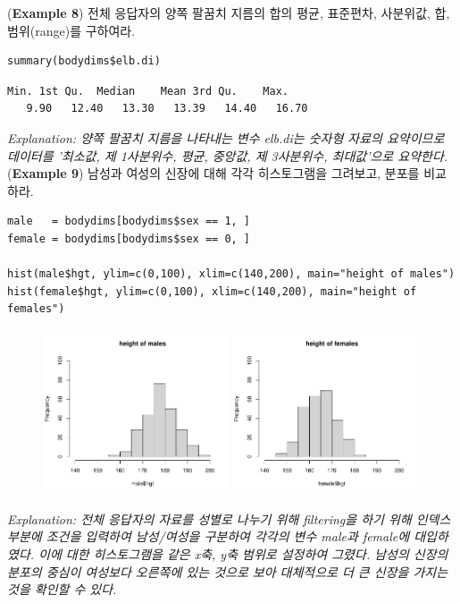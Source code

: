 \documentclass{article}
\begin{document}
(\textbf{Example 8}) 전체 응답자의 양쪽 팔꿈치 지름의 합의 평균, 표준편차, 사분위값, 합, 범위(range)를 구하여라.
\begin{lstlisting}[style={r-style}]
summary(bodydims$elb.di)
\end{lstlisting}
\begin{lstlisting}[style={out-style}]
   Min. 1st Qu.  Median    Mean 3rd Qu.    Max. 
   9.90   12.40   13.30   13.39   14.40   16.70
\end{lstlisting}
\emph{Explanation: 양쪽 팔꿈치 지름을 나타내는 변수 elb.di는 숫자형 자료의 요약이므로 데이터를 '최소값, 제 1사분위수, 평균, 중앙값, 제 3사분위수, 최대값'으로 요약한다. } \\

(\textbf{Example 9}) 남성과 여성의 신장에 대해 각각 히스토그램을 그려보고, 분포를 비교하라.
\begin{lstlisting}[style={r-style}]
male   = bodydims[bodydims$sex == 1, ]
female = bodydims[bodydims$sex == 0, ]

hist(male$hgt, ylim=c(0,100), xlim=c(140,200), main="height of males")
hist(female$hgt, ylim=c(0,100), xlim=c(140,200), main="height of females")
\end{lstlisting}
\begin{figure}[htb!]
    \centering
    \includegraphics[width=0.49\textwidth]{fig/ex9-0.pdf}
    \includegraphics[width=0.49\textwidth]{fig/ex9-1.pdf}
    \label{fig:ex9}
\end{figure}
\emph{Explanation: 전체 응답자의 자료를 성별로 나누기 위해 filtering을 하기 위해 인덱스 부분에 조건을 입력하여 남성/여성을 구분하여 각각의 변수 male과 female에 대입하였다. 이에 대한 히스토그램을 같은 x축, y축 범위로 설정하여 그렸다. 남성의 신장의 분포의 중심이 여성보다 오른쪽에 있는 것으로 보아 대체적으로 더 큰 신장을 가지는 것을 확인할 수 있다.} \\
\end{document}
